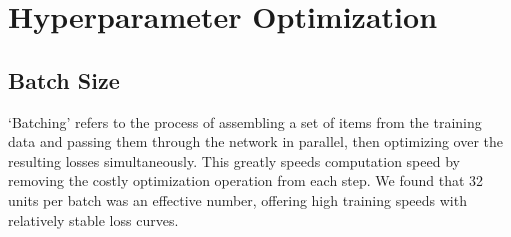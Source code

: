 \section{Hyperparameter Optimization}
\subsection{Batch Size}
`Batching' refers to the process of assembling a set of items from the training 
data and passing them through the network in parallel, then optimizing over the 
resulting losses simultaneously. This greatly speeds computation speed by 
removing the costly optimization operation from each step. We found that 32 
units per batch was an effective number, offering high training speeds with 
relatively stable loss curves.
